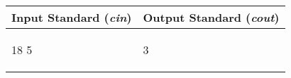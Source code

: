 \documentclass[12pt,a4paper]{article}
\begin{document}
\begin{tabular}{|@{}p{}@{}|@{}p{}@{}|}
\hline
\multicolumn{1}{|c|}{\bfseries Input Standard (\textit{cin})} &
\multicolumn{1}{c|}{\bfseries Output Standard (\textit{cout})} \\
\hline
\begin{textQuoteCell}
18 5
\end{textQuoteCell} &
\begin{textQuoteCell}
3
\end{textQuoteCell} \\    
\hline
\end{tabular}
\vspace{1em}


\end{document}
